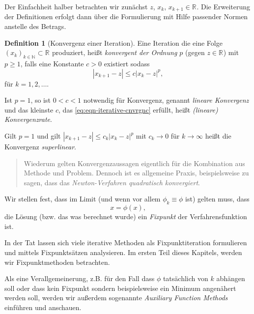 \documentclass[
]{book}
\newenvironment {JHSAYS} [0] {\begin{quote}\color{jhsc}} {\end{quote}}
\theoremstyle{definition}
\newtheorem{definition}{Definition}[chapter]
\theoremstyle{definition}
\theoremstyle{definition}
\theoremstyle{definition}
\theoremstyle{remark}
\begin{document}
Der Einfachheit halber betrachten wir zunächst \(z\), \(x_k\), \(x_{k+1}\in \mathbb R^{}\).
Die Erweiterung der Definitionen erfolgt dann über die Formulierung mit Hilfe passender Normen anstelle des Betrags.

\begin{definition}[Konvergenz einer Iteration]
\protect\hypertarget{def:iterative-convergence}{}\label{def:iterative-convergence}Eine Iteration die eine Folge \((x_k)_{k\in \mathbb N^{}}\subset \mathbb R^{}\) produziert, heißt \emph{konvergent der Ordnung \(p\)} (gegen \(z\in \mathbb R^{}\)) mit \(p\geq 1\), falls eine Konstante \(c>0\) existiert sodass
\begin{equation}
|x_{k+1} - z| \leq c|x_k-z|^p,
\label{eq:eqn-iterative-cnvrgnc}
\end{equation}
für \(k=1, 2, \dotsc\).

Ist \(p=1\), so ist \(0<c<1\) notwendig für Konvergenz, genannt \emph{lineare Konvergenz} und das kleinste \(c\), das \eqref{eq:eqn-iterative-cnvrgnc} erfüllt, heißt \emph{(lineare) Konvergenzrate}.

Gilt \(p=1\) und gilt \(|x_{k+1} - z| \leq c_k|x_k-z|^p\) mit \(c_k \to 0\) für \(k\to \infty\) heißt die Konvergenz \emph{superlinear}.
\end{definition}

\leavevmode{}%
\begin{JHSAYS}
Wiederum gelten Konvergenzaussagen eigentlich für die Kombination aus Methode und Problem. Dennoch ist es allgemeine Praxis, beispielsweise zu sagen, dass das \emph{Newton-Verfahren quadratisch konvergiert}.

\end{JHSAYS}

Wir stellen fest, dass im Limit (und wenn vor allem \(\phi_k \equiv \phi\) ist) gelten muss, dass
\begin{equation*}
x=\phi(x),
\end{equation*}
die Lösung (bzw. das was berechnet wurde) ein \emph{Fixpunkt} der Verfahrensfunktion ist.

In der Tat lassen sich viele iterative Methoden als Fixpunktiteration formulieren und mittels Fixpunktsätzen analysieren. Im ersten Teil dieses Kapitels, werden wir Fixpunktmethoden betrachten.

Als eine Verallgemeinerung, z.B. für den Fall dass \(\phi\) tatsächlich von \(k\) abhängen soll oder dass kein Fixpunkt sondern beispielsweise ein Minimum angenähert werden soll, werden wir außerdem sogenannte \emph{Auxiliary Function Methods} einführen und anschauen.
\end{document}
